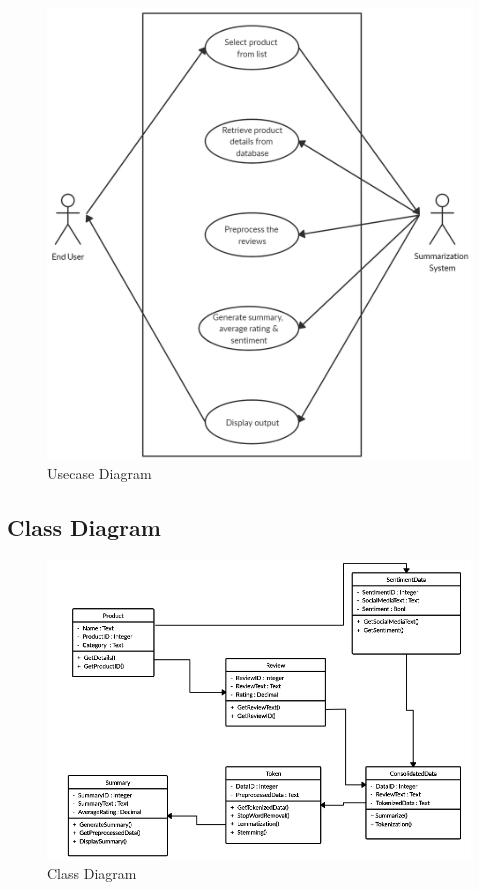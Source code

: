 \documentclass[11pt]{report}
\begin{document}
\begin{figure}[hbt!]
\centering
\includegraphics[scale=0.4]{images/usecase.png}
\caption{Usecase Diagram}
\label{fig:usecase1}
\end{figure}

\pagebreak


\clearpage
\subsection{Class Diagram}
\begin{figure}[hbt!]
\centering
\includegraphics[scale=0.65]{ClassDiagram.png}
\caption{Class Diagram}
\label{fig:classdiagram}
\end{figure}
\end{document}
